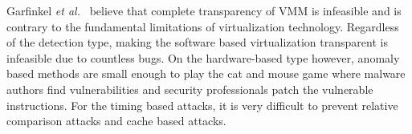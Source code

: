 Garfinkel {\em et al.}~\cite{garfinkel2007} believe that complete transparency
of VMM is infeasible and is contrary to the fundamental limitations of
virtualization technology. Regardless of the detection type, making the software
based virtualization transparent is infeasible due to countless bugs. On the
hardware-based type however, anomaly 
based methods are small enough to play the cat and mouse game where malware
authors find vulnerabilities and security professionals patch the vulnerable
instructions. For the timing based attacks, it is very difficult to prevent
relative comparison attacks and cache based attacks.

